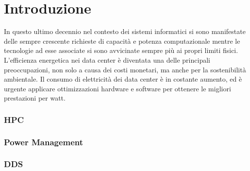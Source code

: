 \chapter{Introduzione}
\noindent
In questo ultimo decennio nel contesto dei sistemi informatici si sono manifestate delle sempre crescente richieste di capacità e potenza computazionale mentre le tecnologie ad esse associate si sono avvicinate sempre più ai propri limiti fisici. L'efficienza energetica nei data center è diventata una delle principali preoccupazioni, non solo a causa dei costi monetari, ma anche per la sostenibilità ambientale. Il consumo di elettricità dei data center è in costante aumento, ed è urgente applicare ottimizzazioni hardware e software per ottenere le migliori prestazioni per watt.
\subsection{HPC}
\subsection{Power Management}
\subsection{DDS}


